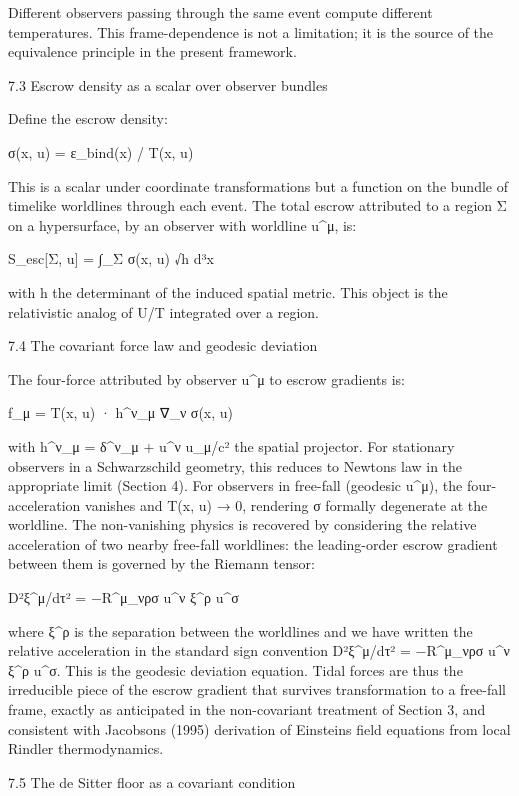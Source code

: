 \documentclass[11pt]{article}
\begin{document}
Different observers passing through the same event compute different temperatures. This frame-dependence is not a limitation; it is the source of the equivalence principle in the present framework.

7.3 Escrow density as a scalar over observer bundles

Define the escrow density:

σ(x, u) = ε\_bind(x) / T(x, u)

This is a scalar under coordinate transformations but a function on the bundle of timelike worldlines through each event. The total escrow attributed to a region Σ on a hypersurface, by an observer with worldline u\^{}μ, is:

S\_esc{[}Σ, u{]} = ∫\_Σ σ(x, u) √h d³x

with h the determinant of the induced spatial metric. This object is the relativistic analog of \textbar U\textbar/T integrated over a region.

7.4 The covariant force law and geodesic deviation

The four-force attributed by observer u\^{}μ to escrow gradients is:

f\_μ = T(x, u) · h\^{}ν\_μ ∇\_ν σ(x, u)

with h\^{}ν\_μ = δ\^{}ν\_μ + u\^{}ν u\_μ/c² the spatial projector. For stationary observers in a Schwarzschild geometry, this reduces to Newton\textquotesingle s law in the appropriate limit (Section 4). For observers in free-fall (geodesic u\^{}μ), the four-acceleration vanishes and T(x, u) → 0, rendering σ formally degenerate at the worldline. The non-vanishing physics is recovered by considering the relative acceleration of two nearby free-fall worldlines: the leading-order escrow gradient between them is governed by the Riemann tensor:

D²ξ\^{}μ/dτ² = −R\^{}μ\_νρσ u\^{}ν ξ\^{}ρ u\^{}σ

where ξ\^{}ρ is the separation between the worldlines and we have written the relative acceleration in the standard sign convention D²ξ\^{}μ/dτ² = −R\^{}μ\_νρσ u\^{}ν ξ\^{}ρ u\^{}σ. This is the geodesic deviation equation. Tidal forces are thus the irreducible piece of the escrow gradient that survives transformation to a free-fall frame, exactly as anticipated in the non-covariant treatment of Section 3, and consistent with Jacobson\textquotesingle s (1995) derivation of Einstein\textquotesingle s field equations from local Rindler thermodynamics.

7.5 The de Sitter floor as a covariant condition
\end{document}
